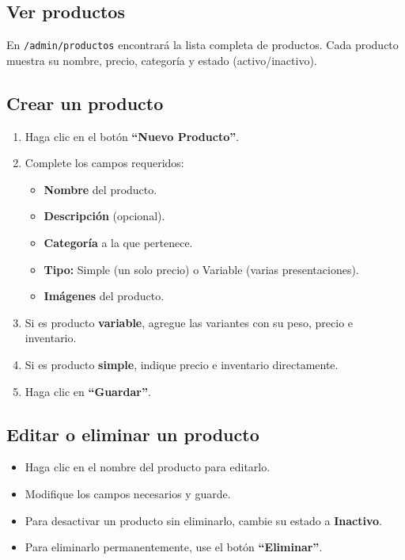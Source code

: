 \documentclass[12pt,a4paper]{article}
\begin{document}
\subsection{Ver productos}
En \texttt{/admin/productos} encontrará la lista completa de productos. Cada producto muestra su nombre, precio, categoría y estado (activo/inactivo).

\subsection{Crear un producto}
\begin{enumerate}[leftmargin=2cm]
    \item Haga clic en el botón \textbf{``Nuevo Producto''}.
    \item Complete los campos requeridos:
    \begin{itemize}
        \item \textbf{Nombre} del producto.
        \item \textbf{Descripción} (opcional).
        \item \textbf{Categoría} a la que pertenece.
        \item \textbf{Tipo:} Simple (un solo precio) o Variable (varias presentaciones).
        \item \textbf{Imágenes} del producto.
    \end{itemize}
    \item Si es producto \textbf{variable}, agregue las variantes con su peso, precio e inventario.
    \item Si es producto \textbf{simple}, indique precio e inventario directamente.
    \item Haga clic en \textbf{``Guardar''}.
\end{enumerate}

\subsection{Editar o eliminar un producto}
\begin{itemize}[leftmargin=2cm]
    \item Haga clic en el nombre del producto para editarlo.
    \item Modifique los campos necesarios y guarde.
    \item Para desactivar un producto sin eliminarlo, cambie su estado a \textbf{Inactivo}.
    \item Para eliminarlo permanentemente, use el botón \textbf{``Eliminar''}.
\end{itemize}
\end{document}
